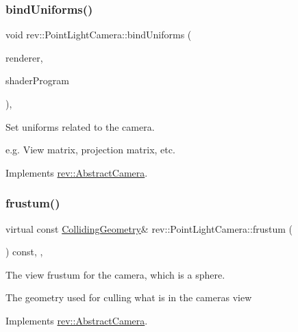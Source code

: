 \subsubsection{\texorpdfstring{bindUniforms()}{bindUniforms()}}
{\footnotesize\ttfamily void rev\+::\+Point\+Light\+Camera\+::bind\+Uniforms (\begin{DoxyParamCaption}\item[{const \mbox{\hyperlink{classrev_1_1_main_renderer}{Main\+Renderer}} $\ast$}]{renderer,  }\item[{\mbox{\hyperlink{classrev_1_1_shader_program}{Shader\+Program}} $\ast$}]{shader\+Program }\end{DoxyParamCaption})\hspace{0.3cm}{\ttfamily [override]}, {\ttfamily [virtual]}}



Set uniforms related to the camera. 

e.\+g. View matrix, projection matrix, etc. 

Implements \mbox{\hyperlink{classrev_1_1_abstract_camera_a6dceba3b328d5e9c3543975e3ae370c0}{rev\+::\+Abstract\+Camera}}.

\mbox{\label{classrev_1_1_point_light_camera_a74ce57f46a3a367cc9b41a499b9996e5}} 
\subsubsection{\texorpdfstring{frustum()}{frustum()}}
{\footnotesize\ttfamily virtual const \mbox{\hyperlink{classrev_1_1_colliding_geometry}{Colliding\+Geometry}}\& rev\+::\+Point\+Light\+Camera\+::frustum (\begin{DoxyParamCaption}{ }\end{DoxyParamCaption}) const\hspace{0.3cm}{\ttfamily [inline]}, {\ttfamily [override]}, {\ttfamily [virtual]}}



The view frustum for the camera, which is a sphere. 

The geometry used for culling what is in the camera\textquotesingle{}s view 

Implements \mbox{\hyperlink{classrev_1_1_abstract_camera_a3bc8bb701690f7e67404a78cfb360708}{rev\+::\+Abstract\+Camera}}.

